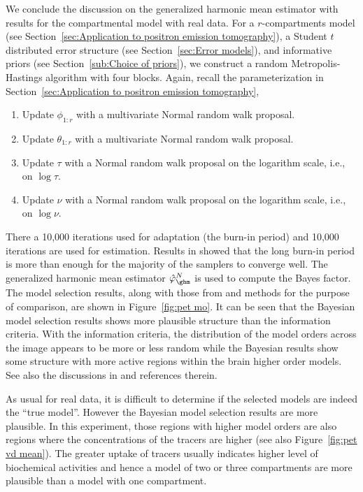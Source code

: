 We conclude the discussion on the generalized harmonic mean estimator with results for the \pet compartmental model with real data. For a $r$-compartments \pet model (see Section~\ref{sec:Application to positron emission tomography}), a Student $t$ distributed error structure (see Section~\ref{sec:Error models}), and informative priors (see Section~\ref{sub:Choice of priors}), we construct a random Metropolis-Hastings algorithm with four blocks. Again, recall the parameterization in Section~\ref{sec:Application to positron emission tomography},
\begin{enumerate}
  \item Update $\phi_{1:r}$ with a multivariate Normal random walk proposal.
  \item Update $\theta_{1:r}$ with a multivariate Normal random walk proposal.
  \item Update $\tau$ with a Normal random walk proposal on the logarithm
    scale, i.e., on $\log\tau$.
  \item Update $\nu$ with a Normal random walk proposal on the logarithm
    scale, i.e., on $\log\nu$.
\end{enumerate}
There  a 10,000 iterations used for adaptation (the burn-in period) and 10,000 iterations are used for estimation. Results in \cite{Zhou2013} showed that the long burn-in period is more than enough for the majority of the samplers to converge well. The generalized harmonic mean estimator $\hat\varphi_{\ghm}^N$ is used to compute the Bayes factor. The model selection results, along with those from \aic and \bic methods for the purpose of comparison, are shown in Figure~\ref{fig:pet mo}. It can be seen that the Bayesian model selection results shows more plausible structure than the information criteria. With the information criteria, the distribution of the model orders across the image appears to be more or less random while the Bayesian results show some structure with more active regions within the brain  higher order models. See also the discussions in \cite{Zhou2013} and references therein.

\begin{draftpar}
As usual for real data, it is difficult to determine if the selected models are indeed the ``true model''. However the Bayesian model selection results are more plausible. In this experiment, those regions with higher model orders are also regions where the concentrations of the tracers are higher (see also Figure~\ref{fig:pet vd mean}). The greater uptake of tracers usually indicates higher level of biochemical activities and hence a model of two or three compartments are more plausible than a model with one compartment.
\end{draftpar} 

